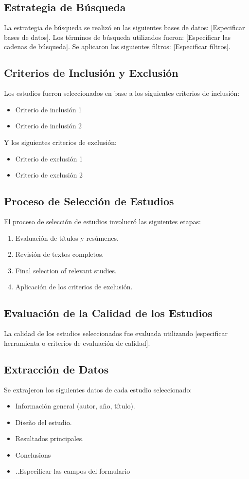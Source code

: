\documentclass{article}
\begin{document}
\subsection{Estrategia de Búsqueda}
\noindent La estrategia de búsqueda se realizó en las siguientes bases de datos: [Especificar bases de datos]. Los términos de búsqueda utilizados fueron: [Especificar las cadenas de búsqueda]. Se aplicaron los siguientes filtros: [Especificar filtros].

\subsection{Criterios de Inclusión y Exclusión}
\noindent Los estudios fueron seleccionados en base a los siguientes criterios de inclusión:
\begin{itemize}
    \item Criterio de inclusión 1
    \item Criterio de inclusión 2
\end{itemize}
Y los siguientes criterios de exclusión:
\begin{itemize}
    \item Criterio de exclusión 1
    \item Criterio de exclusión 2
\end{itemize}

\subsection{Proceso de Selección de Estudios}
\noindent El proceso de selección de estudios involucró las siguientes etapas:
\begin{enumerate}
    \item Evaluación de títulos y resúmenes.
    \item Revisión de textos completos.
    \item Final selection of relevant studies.
    \item Aplicación de los criterios de exclusión.
\end{enumerate}

\subsection{Evaluación de la Calidad de los Estudios}
\noindent La calidad de los estudios seleccionados fue evaluada utilizando [especificar herramienta o criterios de evaluación de calidad].

\subsection{Extracción de Datos}
\noindent Se extrajeron los siguientes datos de cada estudio seleccionado:
\begin{itemize}
    \item Información general (autor, año, título).
    \item Diseño del estudio.
    \item Resultados principales.
    \item Conclusions
    \item ..Especificar las campos del formulario
\end{itemize}
\end{document}
